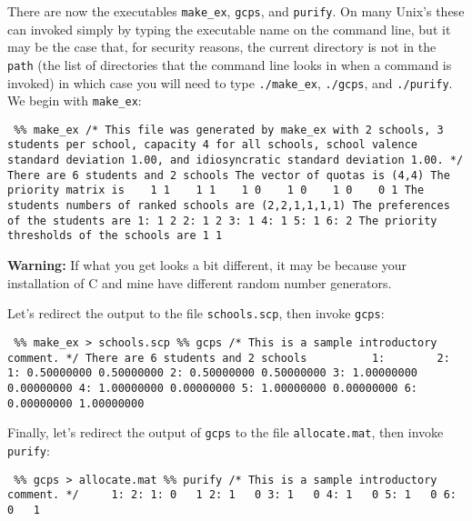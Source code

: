 \documentclass[12pt]{article}
\theoremstyle{definition}
\begin{document}
\begin{appendix}
There are now the executables \texttt{make\_ex}, \texttt{gcps}, and
\texttt{purify}.  On many Unix's these can invoked simply by typing
the executable name on the command line, but it may be the case that,
for security reasons, the current directory is not in the
\texttt{path} (the list of directories that the command line looks in
when a command is invoked) in which case you will need to type
\texttt{./make\_ex}, \texttt{./gcps}, and \texttt{./purify}.  We begin
with \texttt{make\_ex}:
\begin{obeylines}
  \texttt{
    \%\% make\_ex
    /* This file was generated by make\_ex with 2 schools, 3 students
    per school, capacity 4 for all schools, school valence standard
    deviation 1.00, and idiosyncratic standard deviation 1.00. */
There are 6 students and 2 schools
The vector of quotas is (4,4)
The priority matrix is
\ \ \     1    1
\ \ \     1    1
\ \ \     1    0
\ \ \     1    0
\ \ \     1    0
\ \ \     0    1
The students numbers of ranked schools are
(2,2,1,1,1,1)
The preferences of the students are
1:    1   2
2:    1   2
3:    1
4:    1
5:    1
6:    2
The priority thresholds of the schools are
1   1   
    }
\end{obeylines}
\bigskip
\noindent
\textbf{Warning:} If what you get looks a bit different, it may be
because your installation of C and mine have different random number
generators.

Let's redirect the output to the file \texttt{schools.scp}, then invoke \texttt{gcps}:
\begin{obeylines}
  \texttt{
    \%\% make\_ex > schools.scp
    \%\% gcps
  /* This is a sample introductory comment. */
There are 6 students and 2 schools
\ \ \ \ \ \ \ \ \           1:   \ \ \ \ \ \ \        2:
1:   0.50000000  0.50000000
2:   0.50000000  0.50000000
3:   1.00000000  0.00000000
4:   1.00000000  0.00000000
5:   1.00000000  0.00000000
6:   0.00000000  1.00000000
  }
\end{obeylines}
\bigskip



Finally, let's redirect the output of \texttt{gcps} to the file \texttt{allocate.mat}, then invoke \texttt{purify}:
\begin{obeylines}
  \texttt{
    \%\% gcps > allocate.mat
    \%\% purify
    /* This is a sample introductory comment. */
\ \ \ \          1:   2:
   1:    0 \ \    1
   2:    1 \ \    0
   3:    1 \ \    0
   4:    1 \ \    0
   5:    1 \ \    0
   6:    0 \ \    1
  }
\end{obeylines}
\bigskip


\end{appendix}
\end{document}
